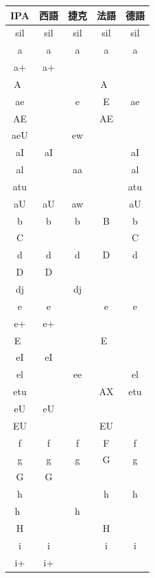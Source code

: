 \begin{table}
\centering
\renewcommand{\arraystretch}{0.5}
\begin{tabular}{|c|cccc|}
\hline
 IPA & 西語 & 捷克 & 法語 & 德語 \\
\hline
 sil  & sil & sil & sil  & sil \\ 
   a  &  a  &  a  & a    &  a  \\
  a+  & a+  &     &      &     \\
  A~  &     &     & A~   &     \\
  ae  &     &  e  & E    &  ae \\
  AE  &     &     & AE   &     \\
  aeU &     &  ew &      &     \\
  aI  & aI  &     &      &  aI \\
  al  &     &  aa &      &  al \\
  atu &     &     &      & atu \\
  aU  & aU  &  aw &      &  aU \\
  b   &  b  &   b &  B   &   b \\
  C   &     &     &      &   C \\
  d   &  d  &   d &  D   &   d \\
  D   &  D  &     &      &     \\
  dj  &     &  dj &      &     \\
  e   &  e  &     & e    &   e \\
  e+  &  e+ &     &      &     \\
  E~  &     &     & E~   &     \\
  eI  & eI  &     &      &     \\
  el  &     &  ee &      &   el \\
  etu &     &     & AX   &  etu \\
  eU  & eU  &     &      &     \\
  EU  &     &     & EU   &     \\
  f   &  f  &  f  & F    &   f  \\
  g   &  g  &  g  & G    &   g  \\
  G   &  G  &     &      &     \\
  h   &     &     & h    &   h  \\
  h~  &     &  h  &      &     \\
  H   &     &     & H    &     \\
  i   &  i  &     & i    &   i  \\
  i+  &  i+ &     &      &     \\

\end{tabular}
\end{table}

